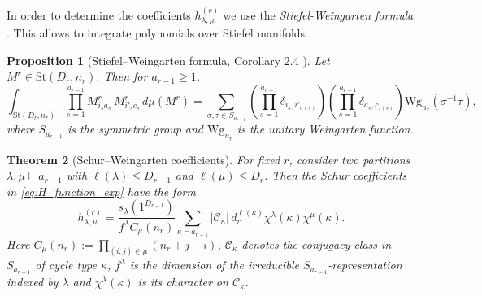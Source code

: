 \documentclass{article}
\newtheorem{theorem}{Theorem}
\newtheorem{proposition}[theorem]{Proposition}
\theoremstyle{definition}
\newcommand{\St}{\mathrm{St}}
\begin{document}
\noindent In order to determine the coefficients $h_{\lambda,\mu}^{(r)}$ we use the \emph{Stiefel-Weingarten formula} \cite{Collins_2006,Collins_2017,Collins_2022}. This allows to integrate polynomials over Stiefel manifolds.
\begin{proposition}[Stiefel--Weingarten formula, Corollary 2.4 \cite{Collins_2006}]\label{prop:stiefel_weingarten}
Let \(M^r\in \St(D_r,n_r)\). Then for \(a_{r-1}\ge 1\),
\begin{equation}\label{eq:stiefel_weingarten_formula}
\int_{\St(D_r,n_r)}
\prod_{s=1}^{a_{r-1}} M^r_{i_s a_s}\,
\overline{M^r_{i'_s c_s}}
\,d\mu(M^r)
=
\sum_{\sigma,\tau\in S_{a_{r-1}}}
\left(\prod_{s=1}^{a_{r-1}} \delta_{i_s,i'_{\sigma(s)}}\right)
\left(\prod_{s=1}^{a_{r-1}} \delta_{a_s,c_{\tau(s)}}\right)
\mathrm{Wg}_{n_r}(\sigma^{-1}\tau),
\end{equation}
where $S_{a_{r-1}}$ is the symmetric group and \(\mathrm{Wg}_{n_r}\) is the unitary
Weingarten function.
\end{proposition}
\begin{theorem}[Schur--Weingarten coefficients]\label{thm:H_coefficients}
For fixed $r$, consider two partitions \(\lambda,\mu\vdash a_{r-1}\) with $\ell(\lambda)\le D_{r-1}$ and $\ell(\mu)\le D_r$.
Then the Schur coefficients in \eqref{eq:H_function_exp} have the form
\begin{equation}\label{eq:h_coeff}
    h_{\lambda,\mu}^{(r)}
=
\frac{s_\lambda(1^{D_{r-1}})}
{f^\lambda C_\mu(n_r)}
\sum_{\kappa\vdash a_{r-1}}
|\mathcal C_\kappa|\,
d_r^{\ell(\kappa)}
\chi^\lambda(\kappa)\chi^\mu(\kappa).
\end{equation}
Here $C_\mu(n_r)
:=
\prod_{(i,j)\in\mu}(n_r+j-i)$, \(\mathcal C_\kappa\) denotes the conjugacy class in \(S_{a_{r-1}}\) of cycle type \(\kappa\), \(f^\lambda\) is the dimension of the irreducible \(S_{a_{r-1}}\)-representation
indexed by \(\lambda\) and $\chi^\lambda(\kappa)$ is its character on \(\mathcal C_\kappa\).
\end{theorem}
\end{document}

